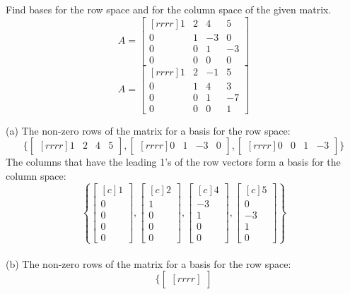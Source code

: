 \ii Find bases for the row space and for the column space of the given matrix.
\bb
\ii 
$$A=
\begin{bmatrix}[rrrr]
1&2&4&5\\
0&1&-3&0\\
0&0&1&-3\\
0&0&0&0
\end{bmatrix}
$$
\ii 
$$A=
\begin{bmatrix}[rrrr]
1&2&-1&5\\
0&1&4&3\\
0&0&1&-7\\
0&0&0&1
\end{bmatrix}
$$
\ee
\begin{solution}
\noindent
(a) The non-zero rows of the matrix for a basis for the row space:
$$
\{
\begin{bmatrix}[rrrr]
1&2&4&5
\end{bmatrix},
\begin{bmatrix}[rrrr]
0&1&-3&0
\end{bmatrix},
\begin{bmatrix}[rrrr]
0&0&1&-3
\end{bmatrix}\}
$$
The columns that have the leading 1's of the row vectors form a basis for the column space:
$$
\left\{
\begin{bmatrix}[c]
1\\
0\\
0\\
0\\
0
\end{bmatrix},
\begin{bmatrix}[c]
2\\
1\\
0\\
0\\
0
\end{bmatrix},
\begin{bmatrix}[c]
4\\
-3\\
1\\
0\\
0
\end{bmatrix},
\begin{bmatrix}[c]
5\\
0\\
-3\\
1\\
0
\end{bmatrix}
\right\}
$$
\\
(b) The non-zero rows of the matrix for a basis for the row space:
$$
\{
\begin{bmatrix}[rrrr]

\end{bmatrix}$$
\end{solution}
